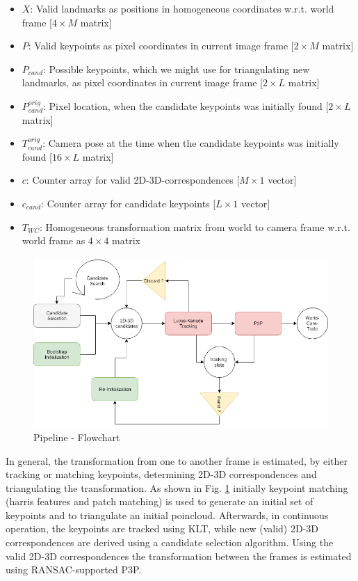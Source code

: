 \documentclass[letterpaper, 12 pt]{article}
\begin{document}
\begin{multicols*}{2}
\begin{itemize}
\item $X$: Valid landmarks as positions in homogeneous coordinates w.r.t. world frame [$4\times M$ matrix]
\item $P$: Valid keypoints as pixel coordinates in current image frame [$2 \times M$ matrix]
\item $P_{cand}$: Possible keypoints, which we might use for triangulating new landmarks, as pixel coordinates in current image frame [$2 \times L$ matrix]
\item $P_{cand}^{orig}$: Pixel location, when the candidate keypoints was initially found [$2 \times L$ matrix]
\item $T_{cand}^{orig}$: Camera pose at the time when the candidate keypoints was initially found [$16 \times L$ matrix]
\item $c$: Counter array for valid 2D-3D-correspondences [$M \times 1$ vector]
\item $c_{cand}$: Counter array for candidate keypoints [$L \times 1$ vector]
\item $T_{WC}$: Homogeneous transformation matrix from world to camera frame w.r.t. world frame as $4 \times 4$ matrix
\end{itemize}

\begin{figure}[H]
\begin{center}
\includegraphics[width=\linewidth]{process.png}
\end{center}
\caption{Pipeline - Flowchart}
\label{fig:process}
\end{figure}

In general, the transformation from one to another frame is estimated, by either tracking or matching keypoints, determining 2D-3D correspondences and triangulating the transformation. As shown in Fig. \ref{fig:process} initially keypoint matching (harris features and patch matching) is used to generate an initial set of keypoints and to triangulate an initial poincloud. Afterwards, in continuous operation, the keypoints are tracked using KLT, while new (valid) 2D-3D correspondences are derived using a candidate selection algorithm. Using the valid 2D-3D correspondences the transformation between the frames is estimated using RANSAC-supported P3P. 


\end{multicols*}
\end{document}
